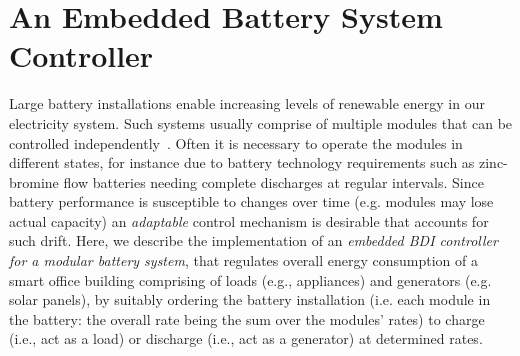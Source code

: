 \section{An Embedded Battery System Controller}\label{sec:application}

\newcommand{\aSet}{\mathname{set}}
\newcommand{\aOperate}{\mathname{operate}}
\newcommand{\aEvaluate}{\mathname{evaluate}}

\newcommand{\pSet}{\mathname{Set*}}
\newcommand{\pSetCharge}{\mathname{SetCharge}}
\newcommand{\pSetDischarge}{\mathname{SetDischarge}}
\newcommand{\pSetNotUsed}{\mathname{SetNotUsed}}
\newcommand{\pExecute}{\mathname{Execute}}

\newcommand{\cSatisfies}{\psi}



Large battery installations enable increasing levels of renewable energy in our electricity system. 
%
Such systems usually comprise of multiple modules that can be controlled independently~\cite{norris02:grid}. 
Often it is necessary to operate the modules in different states, for instance due to battery technology requirements such as zinc-bromine flow batteries needing complete discharges at regular intervals. 
Since battery performance is susceptible to changes over time (e.g. modules may lose actual capacity) an \emph{adaptable} control mechanism is desirable that accounts for such drift.
%
Here, we describe the implementation of an {\em embedded BDI controller for a modular battery system}, that regulates overall energy consumption of a smart office building comprising of loads (e.g., appliances) and generators (e.g. solar panels), by suitably ordering the battery installation (i.e. each module in the battery: the overall rate being the sum over the modules' rates) to charge (i.e., act as a load) or discharge (i.e., act as a generator) at determined rates.


